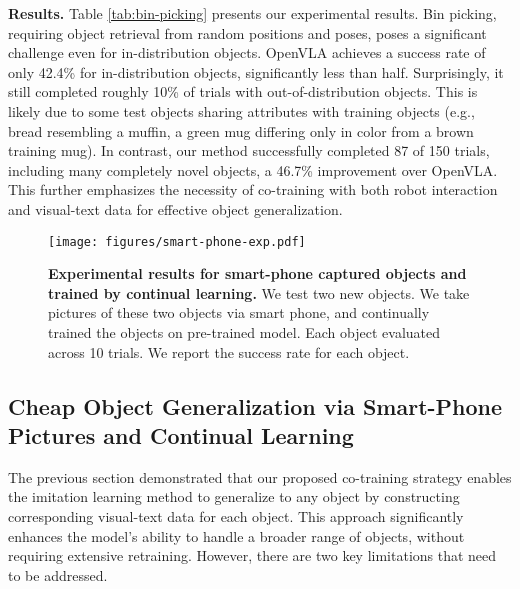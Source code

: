 \noindent
\textbf{Results.} Table \ref{tab:bin-picking} presents our experimental results.  Bin picking, requiring object retrieval from random positions and poses, poses a significant challenge even for in-distribution objects.  OpenVLA achieves a success rate of only 42.4\% for in-distribution objects, significantly less than half. Surprisingly, it still completed roughly 10\% of trials with out-of-distribution objects. This is likely due to some test objects sharing attributes with training objects (e.g., bread resembling a muffin, a green mug differing only in color from a brown training mug).  In contrast, our method successfully completed 87 of 150 trials, including many completely novel objects, a 46.7\% improvement over OpenVLA. This further emphasizes the necessity of co-training with both robot interaction and visual-text data for effective object generalization.


\begin{figure}[t]
    \centering
    \texttt{[image: figures/smart-phone-exp.pdf]}
    \caption{\textbf{Experimental results for smart-phone captured objects and trained by continual learning.} We test two new objects. We take pictures of these two objects via smart phone, and continually trained the objects on pre-trained model. Each object evaluated across 10 trials. We report the success rate for each object.}\label{fig:smart-phone}
\end{figure}

\subsection{Cheap Object Generalization via Smart-Phone Pictures and Continual Learning}
\label{sec:smart-phone}


The previous section demonstrated that our proposed co-training strategy enables the imitation learning method to generalize to any object by constructing corresponding visual-text data for each object. This approach significantly enhances the model's ability to handle a broader range of objects, without requiring extensive retraining. However, there are two key limitations that need to be addressed.

